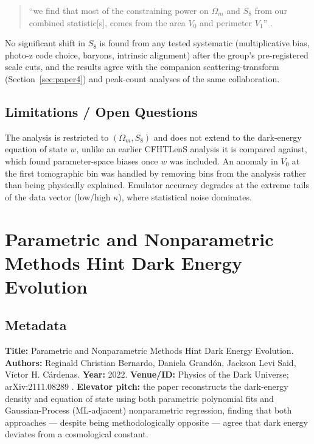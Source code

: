 \documentclass[11pt]{article}
\begin{document}
\begin{quote}
\enquote{we find that most of the constraining power on $\Omega_m$ and $S_8$ from our combined statistic[s], comes from the area $V_0$ and perimeter $V_1$} \citep[p.~7]{armijo2025minkowski}.
\end{quote}

\noindent No significant shift in $S_8$ is found from any tested systematic (multiplicative bias, photo-z code choice, baryons, intrinsic alignment) after the group's pre-registered scale cuts, and the results agree with the companion scattering-transform (Section~\ref{sec:paper4}) and peak-count analyses of the same collaboration.

\subsection{Limitations / Open Questions}
The analysis is restricted to $(\Omega_m,S_8)$ and does not extend to the dark-energy equation of state $w$, unlike an earlier CFHTLenS analysis it is compared against, which found parameter-space biases once $w$ was included. An anomaly in $V_0$ at the first tomographic bin was handled by removing bins from the analysis rather than being physically explained. Emulator accuracy degrades at the extreme tails of the data vector (low/high $\kappa$), where statistical noise dominates.

\section{Parametric and Nonparametric Methods Hint Dark Energy Evolution}
\label{sec:paper6}

\subsection{Metadata}
\textbf{Title:} Parametric and Nonparametric Methods Hint Dark Energy Evolution. \textbf{Authors:} Reginald Christian Bernardo, Daniela Grandón, Jackson Levi Said, Víctor H. Cárdenas. \textbf{Year:} 2022. \textbf{Venue/ID:} Physics of the Dark Universe; arXiv:2111.08289 \citep{bernardo2022parametric}. \textbf{Elevator pitch:} the paper reconstructs the dark-energy density and equation of state using both parametric polynomial fits and Gaussian-Process (ML-adjacent) nonparametric regression, finding that both approaches — despite being methodologically opposite — agree that dark energy deviates from a cosmological constant.
\end{document}
